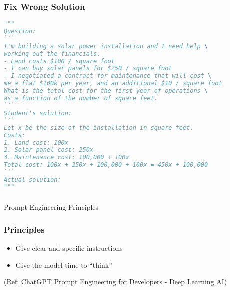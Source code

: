 \begin{frame}[fragile]\frametitle{Fix Wrong Solution}


{\tiny
\begin{lstlisting}[language=Python]
"""
Question:
```
I'm building a solar power installation and I need help \
working out the financials. 
- Land costs $100 / square foot
- I can buy solar panels for $250 / square foot
- I negotiated a contract for maintenance that will cost \
me a flat $100k per year, and an additional $10 / square foot
What is the total cost for the first year of operations \
as a function of the number of square feet.
``` 
Student's solution:
```
Let x be the size of the installation in square feet.
Costs:
1. Land cost: 100x
2. Solar panel cost: 250x
3. Maintenance cost: 100,000 + 100x
Total cost: 100x + 250x + 100,000 + 100x = 450x + 100,000
```
Actual solution:
"""
\end{lstlisting}
}
\end{frame}

\begin{frame}[fragile]\frametitle{}
\begin{center}
{\Large Prompt Engineering Principles}
\end{center}
\end{frame}


\begin{frame}[fragile]\frametitle{Principles}

\begin{itemize}
\item Give clear and specific instructions
\item Give the model time to “think”
\end{itemize}
		
{\tiny (Ref: ChatGPT Prompt Engineering for Developers - Deep Learning AI)}
		
\end{frame}





